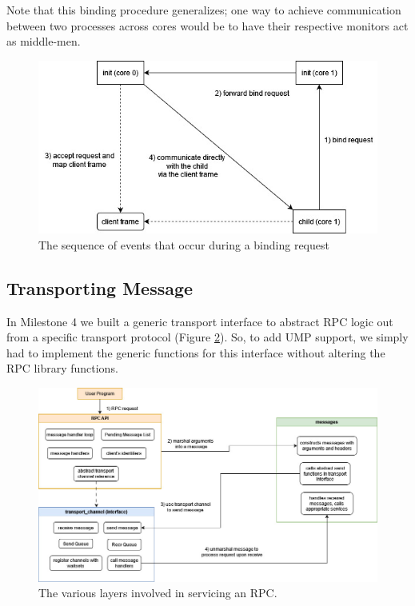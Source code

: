 Note that this binding procedure generalizes; one way to achieve communication between two processes across cores would be to have their respective monitors act as middle-men.
\begin{figure}[ht]
    \centering
    \includegraphics[width=0.8\columnwidth]{images/m6-bind.jpg}
    \caption{The sequence of events that occur during a binding request}
    \label{figure:m6-bind}
\end{figure}

\subsection{Transporting Message}
In Milestone 4 we built a generic transport interface to abstract RPC logic out from a specific transport protocol (Figure \ref{figure:m6-rpc-layout}). So, to add UMP support, we simply had to implement the generic functions for this interface without altering the RPC library functions.
\begin{figure}[ht]
    \centering
    \includegraphics[width=\columnwidth]{images/m6-rpc-layout.jpg}
    \caption{The various layers involved in servicing an RPC.}
    \label{figure:m6-rpc-layout}
\end{figure}


